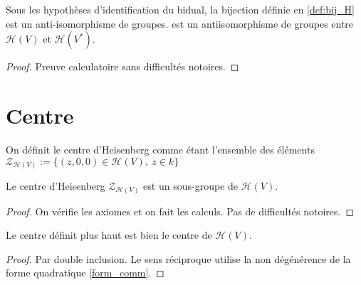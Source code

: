 \begin{definition}
    \label{prop:antiisoH}
    \leanok 

    Sous les hypothèses d'identification du bidual, la bijection définie en \ref{def:bij_H} est un anti-isomorphisme de groupes.
    est un antiisomorphisme de groupes entre $\mathcal{H}(V)$ et $\mathcal{H}(V^*)$.
    \begin{proof}
        \leanok
        Preuve calculatoire sans difficultés notoires.
    \end{proof}
\end{definition}

\section{Centre}

\begin{definition}
    \label{def:center_H}
    \leanok 

    On définit le centre d'Heisenberg comme étant l'ensemble des éléments
    $\mathcal{Z}_{\mathcal{H}(V)}:=\{(z,0,0)\in\mathcal{H}(V),\ z\in k\}$
\end{definition}

\begin{proposition}
    \label{prop:center_H_subgroup}
    \leanok

    Le centre d'Heisenberg $\mathcal{Z}_{\mathcal{H}(V)}$ est un sous-groupe
    de $\mathcal{H}(V)$.
    \begin{proof}
        \leanok
        On vérifie les axiomes et on fait les calculs. Pas de difficultés notoires.
    \end{proof}
\end{proposition}

\begin{proposition}
    \label{prop:center_H_is_center}
    \leanok

    Le centre définit plus haut est bien le centre de $\mathcal{H}(V)$.
    \begin{proof}
        \leanok
        Par double inclusion. Le sens réciproque utilise la non dégénérence de la forme
        quadratique \ref{form_comm}.
    \end{proof}
\end{proposition}

